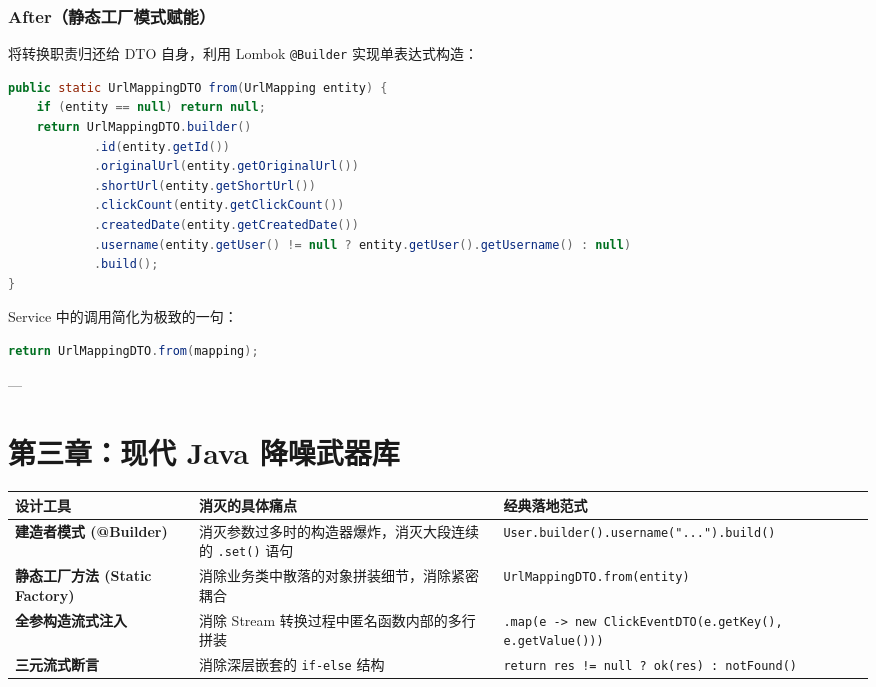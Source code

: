 \documentclass[11pt,a4paper]{ctexart}
\begin{document}
\subsubsection{After（静态工厂模式赋能）}
将转换职责归还给 DTO 自身，利用 Lombok \texttt{@Builder} 实现单表达式构造：
\begin{lstlisting}[language=Java]
public static UrlMappingDTO from(UrlMapping entity) {
    if (entity == null) return null;
    return UrlMappingDTO.builder()
            .id(entity.getId())
            .originalUrl(entity.getOriginalUrl())
            .shortUrl(entity.getShortUrl())
            .clickCount(entity.getClickCount())
            .createdDate(entity.getCreatedDate())
            .username(entity.getUser() != null ? entity.getUser().getUsername() : null)
            .build();
}
\end{lstlisting}
Service 中的调用简化为极致的一句：
\begin{lstlisting}[language=Java]
return UrlMappingDTO.from(mapping);
\end{lstlisting}

---

\section{第三章：现代 Java 降噪武器库}

\begin{table}[htbp]
\centering
\begin{tabularx}{\textwidth}{@{}l X X@{}}
\toprule
\textbf{设计工具} & \textbf{消灭的具体痛点} & \textbf{经典落地范式} \\ \midrule
\textbf{建造者模式 (@Builder)} & 消灭参数过多时的构造器爆炸，消灭大段连续的 \texttt{.set()} 语句 & \lstinline|User.builder().username("...").build()| \\
\textbf{静态工厂方法 (Static Factory)} & 消除业务类中散落的对象拼装细节，消除紧密耦合 & \lstinline|UrlMappingDTO.from(entity)| \\
\textbf{全参构造流式注入} & 消除 Stream 转换过程中匿名函数内部的多行拼装 & \lstinline|.map(e -> new ClickEventDTO(e.getKey(), e.getValue()))| \\
\textbf{三元流式断言} & 消除深层嵌套的 \texttt{if-else} 结构 & \lstinline|return res != null ? ok(res) : notFound()| \\ \bottomrule
\end{tabularx}
\end{table}
\end{document}
